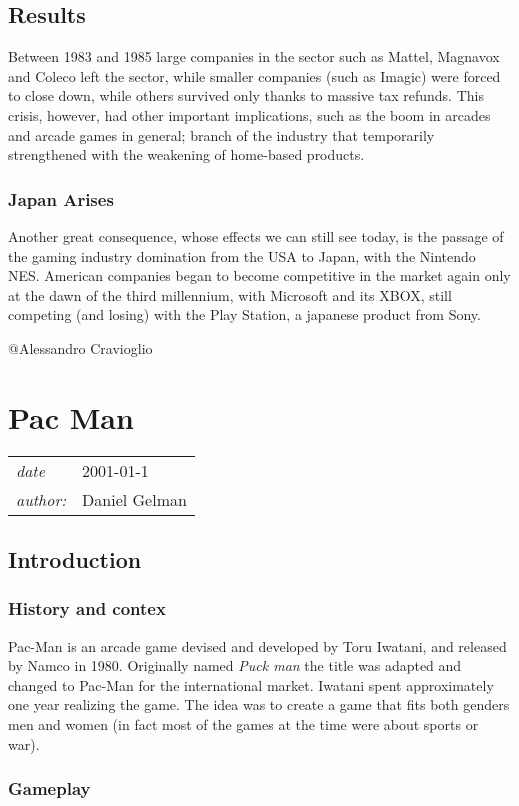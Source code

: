 \documentclass[a4paper,10pt]{book}
\newcommand{\pageHeader}[4]{
    \section{#1}
    \vspace{-0.3cm}
    \begin{table}[h!]
     \begin{tabular}{ll}
        \hline
        \textit{date} & #2 \\
        \textit{author: } & #3\\
        \hline
     \end{tabular}
    \end{table}
    \vspace{-0.3cm}
}
\begin{document}
 \subsection{Results }
 
            Between 1983 and 1985 large companies in the sector such as Mattel, Magnavox and Coleco left the sector,
            while smaller companies (such as Imagic) were forced to close down, while others survived only thanks to massive tax refunds.
            This crisis, however, had other important implications, such as the boom in arcades and arcade games in general;
            branch of the industry that temporarily strengthened with the weakening of home-based products.
            \subsubsection{Japan Arises }
            Another great consequence, whose effects we can still see today, is the passage of the gaming industry
            domination from the USA to Japan, with the Nintendo NES. American companies began to become competitive
            in the market again only at the dawn of the third millennium, with Microsoft and its XBOX, still competing
        (and losing) with the Play Station, a japanese product from Sony.
         
 
 @Alessandro Cravioglio 
 
 \newpage\pageHeader{Pac Man}{2001-01-1}{Daniel Gelman}{Pac man is an arcade game created in 1980, this is an iconic game that deserves to be played even today (be aware ! could be addicting)}
 \subsection{Introduction }
 \subsubsection{History and contex }
   \textbf{}   \textit{}
 
                Pac-Man is an arcade game devised and developed by Toru Iwatani, and released by Namco in 1980.   Originally named  \textit{Puck man } the title was adapted and changed to Pac-Man for the international market.   Iwatani spent approximately
                one year realizing the game. The idea was to create a game that fits both genders men and women (in fact most of the games at the time were about sports or war).  
 
 \subsubsection{Gameplay }
   \textbf{}   \textit{}
 
\end{document}
